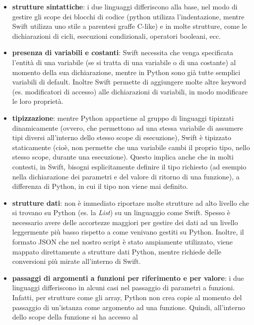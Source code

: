 \begin{itemize}
    \item \textbf{strutture sintattiche}: i due linguaggi differiscono alla base,
    nel modo di gestire gli scope dei blocchi di codice (python utilizza
    l'indentazione, mentre Swift utilizza uno stile a parentesi graffe
    C-like) e in molte strutture, come le dichiarazioni di cicli, 
    esecuzioni condizionali, operatori booleani, ecc.
    \item \textbf{presenza di variabili e costanti}: Swift necessita che venga 
    specificata l'entità di una variabile (se si tratta di una variabile
    o di una costante) al momento della sua dichiarazione, mentre in Python
    sono già tutte semplici variabili di default. Inoltre Swift permette
    di aggiungere molte altre keyword (es. modificatori di accesso) alle
    dichiarazioni di variabili, in modo modificare le loro proprietà.
    \item \textbf{tipizzazione}: mentre Python appartiene al gruppo di linguaggi
    tipizzati dinamicamente (ovvero, che permettono ad una stessa
    variabile di assumere tipi diversi all'interno dello stesso scope
    di esecuzione), Swift è tipizzato staticamente (cioè, non permette
    che una variabile cambi il proprio tipo, nello stesso scope, durante
    una esecuzione). Questo implica anche che in molti contesti, in Swift,
    bisogni esplicitamente definire il tipo richiesto (ad esempio nella
    dichiarazione dei parametri e del valore di ritorno di una funzione),
    a differenza di Python, in cui il tipo non viene mai definito. 
    \item \textbf{strutture dati}: non è immediato riportare molte strutture ad alto 
    livello che si trovano su Python (es. la \emph{List}) su un linguaggio
    come Swift. Spesso è necessario avere delle accortezze maggiori per 
    gestire dei dati ad un livello leggermente più basso rispetto a come 
    venivano gestiti su Python. Inoltre, il formato JSON che nel nostro 
    script è stato ampiamente utilizzato, viene mappato direttamente 
    a strutture dati Python, mentre richiede delle conversioni più
    mirate all'interno di Swift.
    \item \textbf{passaggi di argomenti a funzioni per riferimento e per valore}:
    i due linguaggi differiscono in alcuni casi nel passaggio di parametri a 
    funzioni. Infatti, per strutture come gli array, Python non crea copie
    al momento del passaggio di un'istanza come argomento ad una funzione.
    Quindi, all'interno dello scope della funzione si ha accesso al 

\end{itemize}
